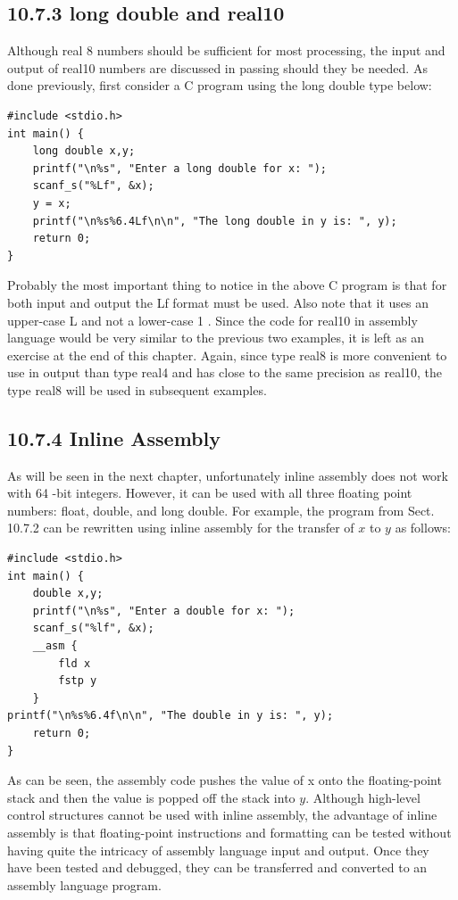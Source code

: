 \documentclass[10pt]{book}
\begin{document}
\subsection*{10.7.3 long double and real10}
Although real 8 numbers should be sufficient for most processing, the input and output of real10 numbers are discussed in passing should they be needed. As done previously, first consider a C program using the long double type below:

\begin{verbatim}
#include <stdio.h>
int main() {
    long double x,y;
    printf("\n%s", "Enter a long double for x: ");
    scanf_s("%Lf", &x);
    y = x;
    printf("\n%s%6.4Lf\n\n", "The long double in y is: ", y);
    return 0;
}
\end{verbatim}

Probably the most important thing to notice in the above C program is that for both input and output the Lf format must be used. Also note that it uses an upper-case L and not a lower-case 1 . Since the code for real10 in assembly language would be very similar to the previous two examples, it is left as an exercise at the end of this chapter. Again, since type real8 is more convenient to use in output than type real4 and has close to the same precision as real10, the type real8 will be used in subsequent examples.

\subsection*{10.7.4 Inline Assembly}
As will be seen in the next chapter, unfortunately inline assembly does not work with 64 -bit integers. However, it can be used with all three floating point numbers: float, double, and long double. For example, the program from Sect. 10.7.2 can be rewritten using inline assembly for the transfer of $x$ to $y$ as follows:

\begin{verbatim}
#include <stdio.h>
int main() {
    double x,y;
    printf("\n%s", "Enter a double for x: ");
    scanf_s("%lf", &x);
    __asm {
        fld x
        fstp y
    }
printf("\n%s%6.4f\n\n", "The double in y is: ", y);
    return 0;
}
\end{verbatim}

As can be seen, the assembly code pushes the value of x onto the floating-point stack and then the value is popped off the stack into $y$. Although high-level control structures cannot be used with inline assembly, the advantage of inline assembly is that floating-point instructions and formatting can be tested without having quite the intricacy of assembly language input and output. Once they have been tested and debugged, they can be transferred and converted to an assembly language program.
\end{document}
